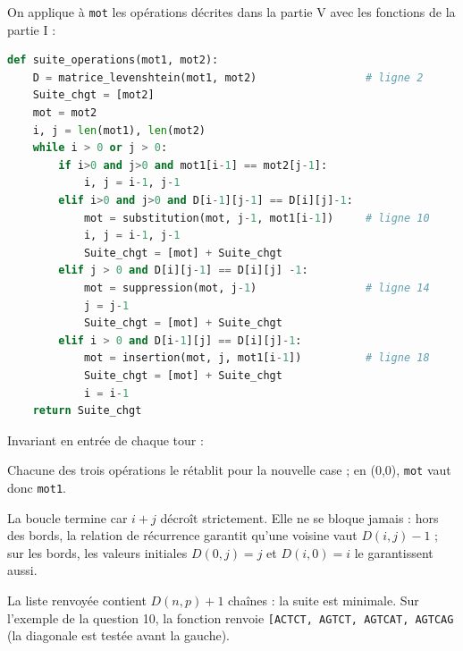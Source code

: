 \documentclass[11pt,a4paper]{article}
\newcommand{\equationajustee}[1]{%
  \sbox{\boiteequation}{$\displaystyle #1$}%
  \ifdim\wd\boiteequation>\linewidth
    \[\resizebox{\linewidth}{!}{\usebox{\boiteequation}}\]%
  \else
    \[#1\]%
  \fi}
\begin{document}
On applique à \texttt{mot} les opérations décrites dans la partie V avec les fonctions de la partie I :

\begin{lstlisting}[language=Python]
def suite_operations(mot1, mot2):
    D = matrice_levenshtein(mot1, mot2)                 # ligne 2
    Suite_chgt = [mot2]
    mot = mot2
    i, j = len(mot1), len(mot2)
    while i > 0 or j > 0:
        if i>0 and j>0 and mot1[i-1] == mot2[j-1]:
            i, j = i-1, j-1
        elif i>0 and j>0 and D[i-1][j-1] == D[i][j]-1:
            mot = substitution(mot, j-1, mot1[i-1])     # ligne 10
            i, j = i-1, j-1
            Suite_chgt = [mot] + Suite_chgt
        elif j > 0 and D[i][j-1] == D[i][j] -1:
            mot = suppression(mot, j-1)                 # ligne 14
            j = j-1
            Suite_chgt = [mot] + Suite_chgt
        elif i > 0 and D[i-1][j] == D[i][j]-1:
            mot = insertion(mot, j, mot1[i-1])          # ligne 18
            Suite_chgt = [mot] + Suite_chgt
            i = i-1
    return Suite_chgt
\end{lstlisting}

Invariant en entrée de chaque tour :

\equationajustee{\texttt{mot}=\texttt{mot2[:j]}+\texttt{mot1[i:]}}

Chacune des trois opérations le rétablit pour la nouvelle case ; en (0,0), \texttt{mot} vaut donc \texttt{mot1}.

La boucle termine car \(i+j\) décroît strictement. Elle ne se bloque jamais : hors des bords, la relation de récurrence garantit qu'une voisine vaut \(D(i,j)-1\) ; sur les bords, les valeurs initiales \(D(0,j)=j\) et \(D(i,0)=i\) le garantissent aussi.

La liste renvoyée contient \(D(n,p)+1\) chaînes : la suite est minimale. Sur l'exemple de la question 10, la fonction renvoie \texttt{{[}\textquotesingle{}ACTCT\textquotesingle{},\allowbreak{}\ \textquotesingle{}AGTCT\textquotesingle{},\allowbreak{}\ \textquotesingle{}AGTCAT\textquotesingle{},\allowbreak{}\ \textquotesingle{}AGTCAG\textquotesingle{}{]}\allowbreak{}} (la diagonale est testée avant la gauche).
\end{document}
